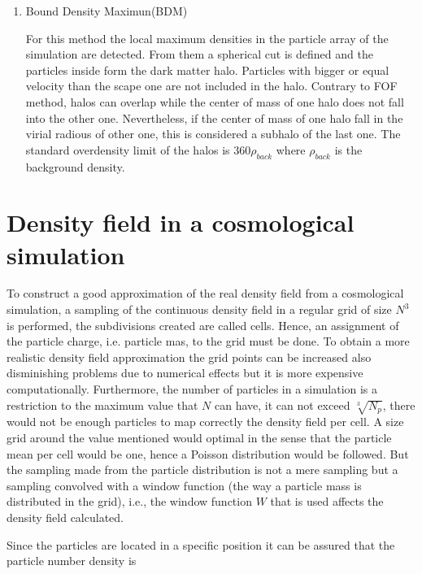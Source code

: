 \begin{enumerate}
\item Bound Density Maximun(BDM)

For this method the local maximum densities in the particle array of the simulation
are detected. From them a spherical cut is defined and the particles inside form 
the dark matter halo. Particles with bigger or equal velocity than the scape one
are not included in the halo. 
Contrary to FOF method, halos can overlap while the center of mass of one halo 
does not fall into the other one. Nevertheless, if the center of mass of one halo
fall in the virial radious of other one, this is considered a subhalo of the last
one. The standard overdensity limit of the halos is $360\rho_{back}$ where $\rho_{back}$
is the background density. 

\end{enumerate}

\section{Density field in a cosmological simulation}

To construct a good approximation of the real density field from a cosmological simulation, 
a sampling of the continuous density field in a regular grid of size $N^3$ is 
performed, the subdivisions created are called cells. Hence, an assignment of the 
particle charge, i.e. particle mas, to the grid must be done. To obtain a more realistic 
density field approximation the grid points can be increased also disminishing problems 
due to numerical effects but it is more expensive computationally. Furthermore, the number 
of particles in a simulation is a restriction to the maximum value that $N$ can have, 
it can not exceed $\sqrt[3]{N_p}$, there would not be enough particles to map correctly 
the density field per cell. A size grid around the value mentioned would optimal in 
the sense that the particle mean per cell would be one, hence a Poisson distribution 
would be followed. But the sampling made from the particle distribution is not a 
mere sampling but a sampling convolved with a window function (the way a particle 
mass is distributed in the grid), i.e., the window function $W$ that is used affects 
the density field calculated. 

Since the particles are located in a specific position it can be assured that
the particle number density is 

